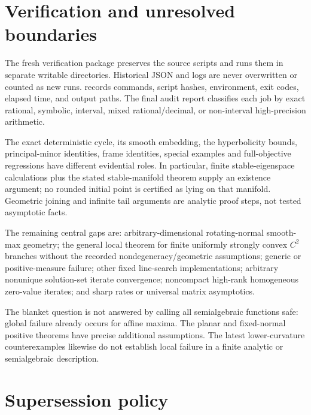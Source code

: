 \documentclass[10pt,oneside,openany]{book}
\theoremstyle{remark}\newtheorem{remark}{Remark}[chapter]
\begin{document}
\section{Verification and unresolved boundaries}\label{verification-and-unresolved-boundaries}

The fresh verification package preserves the source scripts and runs them in separate writable directories. Historical JSON and logs are never overwritten or counted as new runs.  records commands, script hashes, environment, exit codes, elapsed time, and output paths. The final audit report classifies each job by exact rational, symbolic, interval, mixed rational/decimal, or non-interval high-precision arithmetic.

The exact deterministic cycle, its smooth embedding, the hyperbolicity bounds, principal-minor identities, frame identities, special examples and full-objective regressions have different evidential roles. In particular, finite stable-eigenspace calculations plus the stated stable-manifold theorem supply an existence argument; no rounded initial point is certified as lying on that manifold. Geometric joining and infinite tail arguments are analytic proof steps, not tested asymptotic facts.

The remaining central gaps are: arbitrary-dimensional rotating-normal smooth-max geometry; the general local theorem for finite uniformly strongly convex \(C^2\) branches without the recorded nondegeneracy/geometric assumptions; generic or positive-measure failure; other fixed line-search implementations; arbitrary nonunique solution-set iterate convergence; noncompact high-rank homogeneous zero-value iterates; and sharp rates or universal matrix asymptotics.

The blanket question is not answered by calling all semialgebraic functions safe: global failure already occurs for affine maxima. The planar and fixed-normal positive theorems have precise additional assumptions. The latest lower-curvature counterexamples likewise do not establish local failure in a finite analytic or semialgebraic description.

\section{Supersession policy}\label{supersession-policy}
\end{document}
